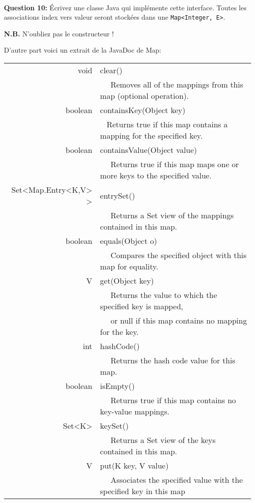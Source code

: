 \documentclass[iutinfo,10pt]{ustl-tdtp}
\begin{document}
~\\ \textbf{Question 10:} Écrivez une classe Java qui implémente cette interface. Toutes les associations index vers valeur seront stockées dans une \texttt{Map<Integer, E>}. 

\vspace{0.5cm}
\textbf{N.B.} N'oubliez pas le constructeur !
\vspace{0.5cm}

\newpage
D'autre part voici un extrait de la JavaDoc de Map:

\begin{center}
\begin{tabular}{|r|l|}
\hline
 void	& clear() \\
        &~~  Removes all of the mappings from this map (optional operation).\\
 \hline
boolean&	containsKey(Object key) \\
        &~  Returns true if this map contains a mapping for the specified key.\\
\hline
 boolean&	containsValue(Object value) \\
        &~~  Returns true if this map maps one or more keys to the specified value.\\
\hline
 Set<Map.Entry<K,V> >&	entrySet() \\
        &~~  Returns a Set view of the mappings contained in this map.\\
\hline
 boolean&	equals(Object o) \\
        &~~  Compares the specified object with this map for equality.\\
\hline
 V	&get(Object key) \\
        &~~ Returns the value to which the specified key is mapped,\\
        &~~ or null if this map contains no mapping for the key.\\
\hline
 int	&hashCode() \\
        &~~  Returns the hash code value for this map.\\
\hline
 boolean&	isEmpty() \\
        &~~  Returns true if this map contains no key-value mappings.\\
\hline
 Set<K>	&keySet() \\
        &~~  Returns a Set view of the keys contained in this map.\\
\hline
 V	&put(K key, V value) \\
        &~~  Associates the specified value with the specified key in this map \\

\end{tabular}
\end{center}
\end{document}
